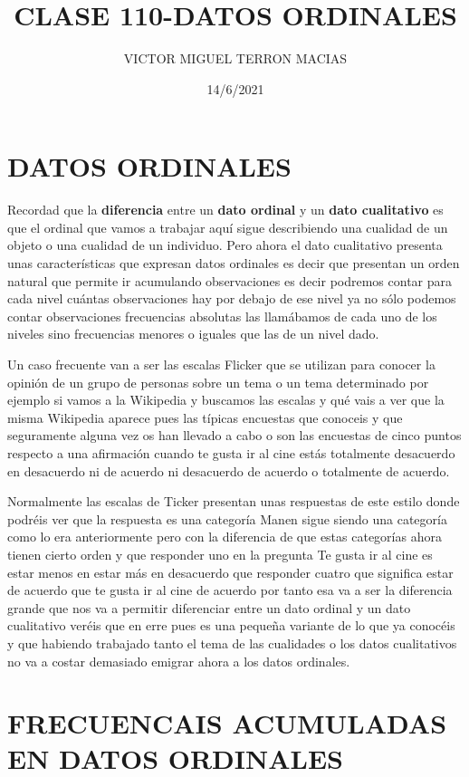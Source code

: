 \documentclass[
]{article}
\title{CLASE 110-DATOS ORDINALES}
\author{VICTOR MIGUEL TERRON MACIAS}
\date{14/6/2021}
\begin{document}
\maketitle

\hypertarget{datos-ordinales}{%
\section{DATOS ORDINALES}\label{datos-ordinales}}

Recordad que la \textbf{diferencia} entre un \textbf{dato ordinal} y un
\textbf{dato cualitativo} es que el ordinal que vamos a trabajar aquí
sigue describiendo una cualidad de un objeto o una cualidad de un
individuo. Pero ahora el dato cualitativo presenta unas características
que expresan datos ordinales es decir que presentan un orden natural que
permite ir acumulando observaciones es decir podremos contar para cada
nivel cuántas observaciones hay por debajo de ese nivel ya no sólo
podemos contar observaciones frecuencias absolutas las llamábamos de
cada uno de los niveles sino frecuencias menores o iguales que las de un
nivel dado.

Un caso frecuente van a ser las escalas Flicker que se utilizan para
conocer la opinión de un grupo de personas sobre un tema o un tema
determinado por ejemplo si vamos a la Wikipedia y buscamos las escalas y
qué vais a ver que la misma Wikipedia aparece pues las típicas encuestas
que conoceis y que seguramente alguna vez os han llevado a cabo o son
las encuestas de cinco puntos respecto a una afirmación cuando te gusta
ir al cine estás totalmente desacuerdo en desacuerdo ni de acuerdo ni
desacuerdo de acuerdo o totalmente de acuerdo.

Normalmente las escalas de Ticker presentan unas respuestas de este
estilo donde podréis ver que la respuesta es una categoría Manen sigue
siendo una categoría como lo era anteriormente pero con la diferencia de
que estas categorías ahora tienen cierto orden y que responder uno en la
pregunta Te gusta ir al cine es estar menos en estar más en desacuerdo
que responder cuatro que significa estar de acuerdo que te gusta ir al
cine de acuerdo por tanto esa va a ser la diferencia grande que nos va a
permitir diferenciar entre un dato ordinal y un dato cualitativo veréis
que en erre pues es una pequeña variante de lo que ya conocéis y que
habiendo trabajado tanto el tema de las cualidades o los datos
cualitativos no va a costar demasiado emigrar ahora a los datos
ordinales.

\hypertarget{frecuencais-acumuladas-en-datos-ordinales}{%
\section{FRECUENCAIS ACUMULADAS EN DATOS
ORDINALES}\label{frecuencais-acumuladas-en-datos-ordinales}}
\end{document}
